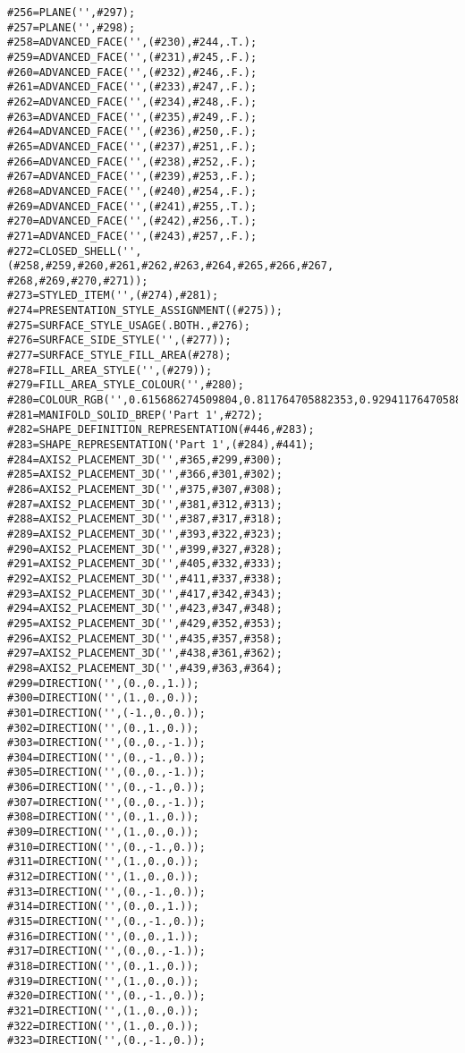 \documentclass[a4paper,12pt]{article}
\begin{document}
\begin{lstlising}[language=C++]
\begin{lstlisting}[language=STEP]
#256=PLANE('',#297);
#257=PLANE('',#298);
#258=ADVANCED_FACE('',(#230),#244,.T.);
#259=ADVANCED_FACE('',(#231),#245,.F.);
#260=ADVANCED_FACE('',(#232),#246,.F.);
#261=ADVANCED_FACE('',(#233),#247,.F.);
#262=ADVANCED_FACE('',(#234),#248,.F.);
#263=ADVANCED_FACE('',(#235),#249,.F.);
#264=ADVANCED_FACE('',(#236),#250,.F.);
#265=ADVANCED_FACE('',(#237),#251,.F.);
#266=ADVANCED_FACE('',(#238),#252,.F.);
#267=ADVANCED_FACE('',(#239),#253,.F.);
#268=ADVANCED_FACE('',(#240),#254,.F.);
#269=ADVANCED_FACE('',(#241),#255,.T.);
#270=ADVANCED_FACE('',(#242),#256,.T.);
#271=ADVANCED_FACE('',(#243),#257,.F.);
#272=CLOSED_SHELL('',(#258,#259,#260,#261,#262,#263,#264,#265,#266,#267,
#268,#269,#270,#271));
#273=STYLED_ITEM('',(#274),#281);
#274=PRESENTATION_STYLE_ASSIGNMENT((#275));
#275=SURFACE_STYLE_USAGE(.BOTH.,#276);
#276=SURFACE_SIDE_STYLE('',(#277));
#277=SURFACE_STYLE_FILL_AREA(#278);
#278=FILL_AREA_STYLE('',(#279));
#279=FILL_AREA_STYLE_COLOUR('',#280);
#280=COLOUR_RGB('',0.615686274509804,0.811764705882353,0.929411764705882);
#281=MANIFOLD_SOLID_BREP('Part 1',#272);
#282=SHAPE_DEFINITION_REPRESENTATION(#446,#283);
#283=SHAPE_REPRESENTATION('Part 1',(#284),#441);
#284=AXIS2_PLACEMENT_3D('',#365,#299,#300);
#285=AXIS2_PLACEMENT_3D('',#366,#301,#302);
#286=AXIS2_PLACEMENT_3D('',#375,#307,#308);
#287=AXIS2_PLACEMENT_3D('',#381,#312,#313);
#288=AXIS2_PLACEMENT_3D('',#387,#317,#318);
#289=AXIS2_PLACEMENT_3D('',#393,#322,#323);
#290=AXIS2_PLACEMENT_3D('',#399,#327,#328);
#291=AXIS2_PLACEMENT_3D('',#405,#332,#333);
#292=AXIS2_PLACEMENT_3D('',#411,#337,#338);
#293=AXIS2_PLACEMENT_3D('',#417,#342,#343);
#294=AXIS2_PLACEMENT_3D('',#423,#347,#348);
#295=AXIS2_PLACEMENT_3D('',#429,#352,#353);
#296=AXIS2_PLACEMENT_3D('',#435,#357,#358);
#297=AXIS2_PLACEMENT_3D('',#438,#361,#362);
#298=AXIS2_PLACEMENT_3D('',#439,#363,#364);
#299=DIRECTION('',(0.,0.,1.));
#300=DIRECTION('',(1.,0.,0.));
#301=DIRECTION('',(-1.,0.,0.));
#302=DIRECTION('',(0.,1.,0.));
#303=DIRECTION('',(0.,0.,-1.));
#304=DIRECTION('',(0.,-1.,0.));
#305=DIRECTION('',(0.,0.,-1.));
#306=DIRECTION('',(0.,-1.,0.));
#307=DIRECTION('',(0.,0.,-1.));
#308=DIRECTION('',(0.,1.,0.));
#309=DIRECTION('',(1.,0.,0.));
#310=DIRECTION('',(0.,-1.,0.));
#311=DIRECTION('',(1.,0.,0.));
#312=DIRECTION('',(1.,0.,0.));
#313=DIRECTION('',(0.,-1.,0.));
#314=DIRECTION('',(0.,0.,1.));
#315=DIRECTION('',(0.,-1.,0.));
#316=DIRECTION('',(0.,0.,1.));
#317=DIRECTION('',(0.,0.,-1.));
#318=DIRECTION('',(0.,1.,0.));
#319=DIRECTION('',(1.,0.,0.));
#320=DIRECTION('',(0.,-1.,0.));
#321=DIRECTION('',(1.,0.,0.));
#322=DIRECTION('',(1.,0.,0.));
#323=DIRECTION('',(0.,-1.,0.));

\end{lstlisting}
\end{lstlising}
\end{document}

